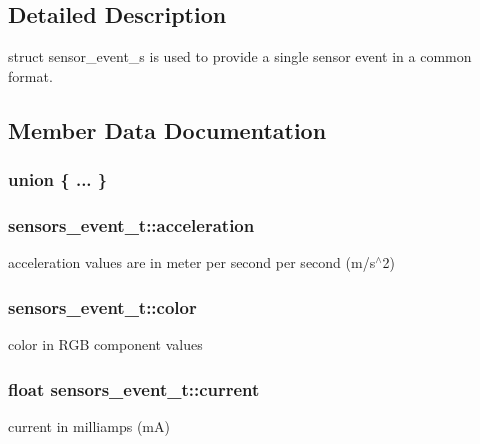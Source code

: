 \subsection{Detailed Description}
struct sensor\+\_\+event\+\_\+s is used to provide a single sensor event in a common format. 

\subsection{Member Data Documentation}
\subsubsection[{\texorpdfstring{"@11}{@11}}]{\setlength{\rightskip}{0pt plus 5cm}union \{ ... \} }\hypertarget{structsensors__event__t_a65765f2fda6943ab0fa6ef1d4b9d7d35}{}\label{structsensors__event__t_a65765f2fda6943ab0fa6ef1d4b9d7d35}
\subsubsection[{\texorpdfstring{acceleration}{acceleration}}]{ sensors\+\_\+event\+\_\+t\+::acceleration}\hypertarget{structsensors__event__t_a91a4325f468d3155e6921358a6f61baa}{}\label{structsensors__event__t_a91a4325f468d3155e6921358a6f61baa}
acceleration values are in meter per second per second (m/s$^\wedge$2) 
\subsubsection[{\texorpdfstring{color}{color}}]{ sensors\+\_\+event\+\_\+t\+::color}\hypertarget{structsensors__event__t_a56b4d05fbf47013727ec1a0a94db91e6}{}\label{structsensors__event__t_a56b4d05fbf47013727ec1a0a94db91e6}
color in R\+GB component values 
\subsubsection[{\texorpdfstring{current}{current}}]{\setlength{\rightskip}{0pt plus 5cm}float sensors\+\_\+event\+\_\+t\+::current}\hypertarget{structsensors__event__t_ad34303af57d6bce18c34862a887fc005}{}\label{structsensors__event__t_ad34303af57d6bce18c34862a887fc005}
current in milliamps (mA) 
